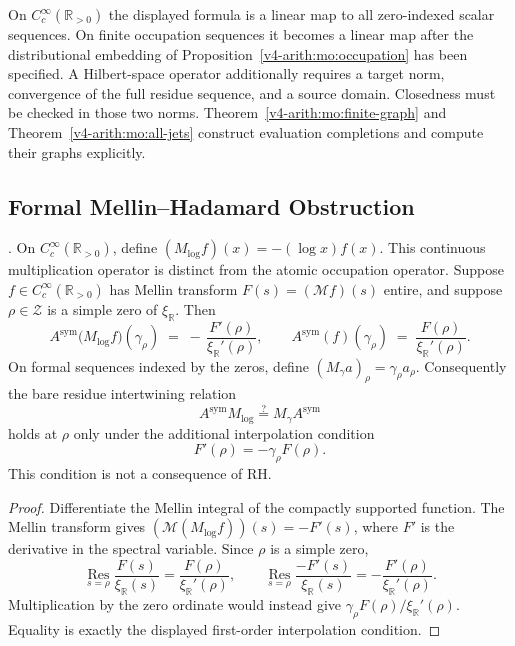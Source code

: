 \begin{remark}
\label{v4-arith:w9-r4:rem:Asym-not-operator}
On $C_c^\infty(\mathbb R_{>0})$ the displayed formula is a linear
map to all zero-indexed scalar sequences. On finite occupation
sequences it becomes a linear map after the distributional embedding
of Proposition~\ref{v4-arith:mo:occupation} has been specified.
A Hilbert-space operator additionally requires a target norm,
convergence of the full residue sequence, and a source domain.
Closedness must be checked in those two norms.
Theorem~\ref{v4-arith:mo:finite-graph} and Theorem~\ref{v4-arith:mo:all-jets} construct
evaluation completions and compute their graphs explicitly.
\end{remark}

\subsection{Formal Mellin--Hadamard Obstruction}
\label{v4-arith:w9-r4:formal-flow:formal-intertwine}

\begin{lemma}
\label{v4-arith:w9-r4:lem:formal-intertwine}
\ClaimStatusProvedHere. On \(C_c^\infty(\mathbb R_{>0})\), define
\((M_{\log}f)(x)=-(\log x)f(x)\). This continuous multiplication
operator is distinct from the atomic occupation operator. Suppose \(f\in C_{c}^{\infty}(\mathbb{R}_{>0})\)
has Mellin transform \(F(s)=(\mathcal{M}f)(s)\) entire, and suppose
\(\rho\in\mathcal{Z}\) is a simple zero of \(\xi_{\mathbb R}\). Then
\begin{equation}
\label{v4-arith:w9-r4:eq:formal-intertwine}
A^{\mathrm{sym}}\bigl(M_{\log}f\bigr)(\gamma_{\rho})
\;=\;
-\,\frac{F'(\rho)}{\xi_{\mathbb R}'(\rho)},
\qquad
A^{\mathrm{sym}}(f)(\gamma_{\rho})
\;=\;
\frac{F(\rho)}{\xi_{\mathbb R}'(\rho)}.
\end{equation}
On formal sequences indexed by the zeros, define
$(M_\gamma a)_\rho=\gamma_\rho a_\rho$.
Consequently the bare residue intertwining relation
\[
A^{\mathrm{sym}}M_{\log}
\stackrel{?}{=}
M_{\gamma}A^{\mathrm{sym}}
\]
holds at \(\rho\) only under the additional interpolation condition
\[
F'(\rho)=-\gamma_{\rho}F(\rho).
\]
This condition is not a consequence of RH.
\end{lemma}

\begin{proof}
Differentiate the Mellin integral of the compactly supported function.
The Mellin transform gives
\((\mathcal{M}(M_{\log}f))(s)=-F'(s)\), where \(F'\) is the
derivative in the spectral variable. Since \(\rho\) is a simple zero,
\[
\operatorname*{Res}_{s=\rho}\frac{F(s)}{\xi_{\mathbb R}(s)}
=\frac{F(\rho)}{\xi_{\mathbb R}'(\rho)},
\qquad
\operatorname*{Res}_{s=\rho}\frac{-F'(s)}{\xi_{\mathbb R}(s)}
=-\frac{F'(\rho)}{\xi_{\mathbb R}'(\rho)}.
\]
Multiplication by the zero ordinate would instead give
\(\gamma_{\rho}F(\rho)/\xi_{\mathbb R}'(\rho)\). Equality is exactly
the displayed first-order interpolation condition.
\end{proof}


